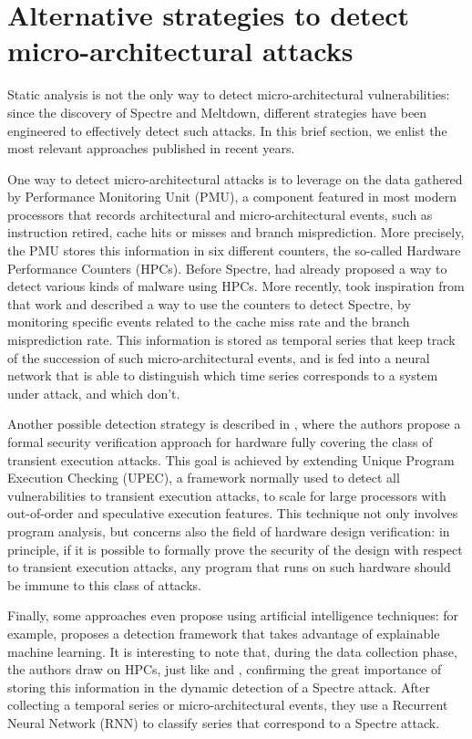 \documentclass[target=mst,aauheader=aics]{thud}
\theoremstyle{definition}
\begin{document}
	\section{Alternative strategies to detect micro-architectural attacks}\label{sec:alternatives}
	Static analysis is not the only way to detect micro-architectural vulnerabilities: since the discovery of Spectre and Meltdown, different strategies have been engineered to effectively detect such attacks. In this brief section, we enlist the most relevant approaches published in recent years.
	
	One way to detect micro-architectural attacks is to leverage on the data gathered by Performance Monitoring Unit (PMU), a component featured in most modern processors that records architectural and micro-architectural events, such as instruction retired, cache hits or misses and branch misprediction. More precisely, the PMU stores this information in six different counters, the so-called Hardware Performance Counters (HPCs). Before Spectre, \cite{Demme2013} had already proposed a way to detect various kinds of malware using HPCs. More recently, \cite{Congmiao2022} took inspiration from that work and described a way to use the counters to detect Spectre, by monitoring specific events related to the cache miss rate and the branch misprediction rate. This information is stored as temporal series that keep track of the succession of such micro-architectural events, and is fed into a neural network that is able to distinguish which time series corresponds to a system under attack, and which don't.
	
	Another possible detection strategy is described in \cite{Fadiheh2020}, where the authors propose a formal security verification approach for hardware fully covering the class of transient execution attacks. This goal is achieved by extending Unique Program Execution Checking (UPEC), a framework normally used to detect all vulnerabilities to transient execution attacks, to scale for large processors with out-of-order and speculative execution features. This technique not only involves program analysis, but concerns also the field of hardware design verification: in principle, if it is possible to formally prove the security of the design with respect to transient execution attacks, any program that runs on such hardware should be immune to this class of attacks. 
	
	Finally, some approaches even propose using artificial intelligence techniques: for example, \cite{Pan2021} proposes a detection framework that takes advantage of explainable machine learning. It is interesting to note that, during the data collection phase, the authors draw on HPCs, just like \cite{Congmiao2022} and \cite{Demme2013}, confirming the great importance of storing this information in the dynamic detection of a Spectre attack. After collecting a temporal series or micro-architectural events, they use a Recurrent Neural Network (RNN) to classify series that correspond to a Spectre attack.
	
\end{document}
